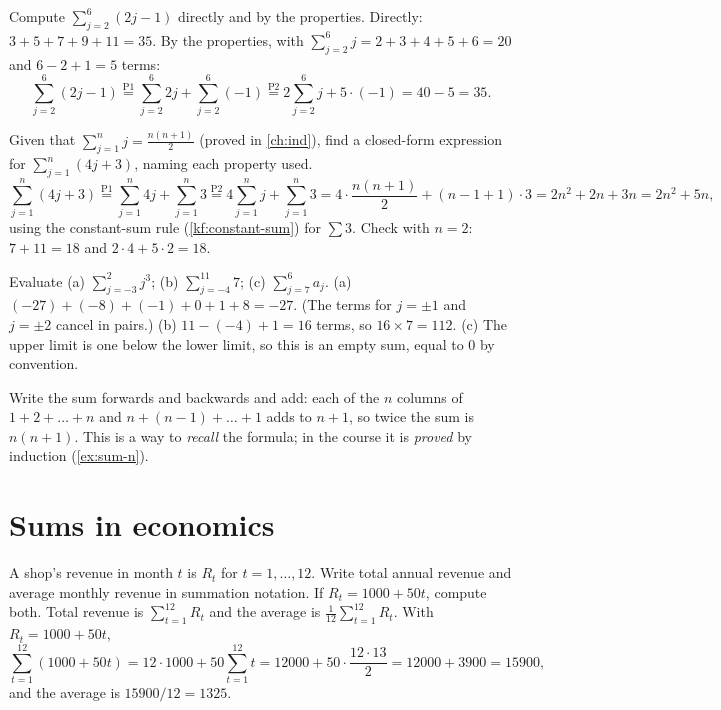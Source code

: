 \begin{example}
Compute $\sum_{j=2}^{6}(2j-1)$ directly and by the properties.
\solution
Directly: $3+5+7+9+11=35$. By the properties, with $\sum_{j=2}^6 j=2+3+4+5+6=20$ and $6-2+1=5$ terms:
\[
\sum_{j=2}^{6}(2j-1)\overset{\text{P1}}{=}\sum_{j=2}^{6}2j+\sum_{j=2}^{6}(-1)\overset{\text{P2}}{=}2\sum_{j=2}^{6}j+5\cdot(-1)=40-5=35.
\]
\end{example}

\begin{example}
Given that $\sum_{j=1}^{n}j=\frac{n(n+1)}{2}$ (proved in \cref{ch:ind}), find a closed-form expression for
$\sum_{j=1}^{n}(4j+3)$, naming each property used. 
\solution
\[
\sum_{j=1}^{n}(4j+3)\overset{\text{P1}}{=}\sum_{j=1}^{n}4j+\sum_{j=1}^{n}3\overset{\text{P2}}{=}4\sum_{j=1}^{n}j+\sum_{j=1}^{n}3
=4\cdot\frac{n(n+1)}{2}+(n-1+1)\cdot3=2n^2+2n+3n=2n^2+5n,
\]
using the constant-sum rule (\cref{kf:constant-sum}) for $\sum 3$. Check with $n=2$: $7+11=18$ and
$2\cdot4+5\cdot2=18$.
\end{example}

\begin{example}
Evaluate (a) $\sum_{j=-3}^{2}j^3$; (b) $\sum_{j=-4}^{11}7$; (c) $\sum_{j=7}^{6}a_j$.
\solution
(a) $(-27)+(-8)+(-1)+0+1+8=-27$. (The terms for $j=\pm1$ and $j=\pm2$ cancel in pairs.)
(b) $11-(-4)+1=16$ terms, so $16\times7=112$.
(c) The upper limit is one below the lower limit, so this is an empty sum, equal to $0$ by convention.
\end{example}

\begin{external}[Recalling $\sum_{j=1}^n j$ by pairing]
Write the sum forwards and backwards and add: each of the $n$ columns of $1+2+\dots+n$ and $n+(n-1)+\dots+1$ adds to
$n+1$, so twice the sum is $n(n+1)$. This is a way to \emph{recall} the formula; in the course it is \emph{proved} by
induction (\cref{ex:sum-n}).
\end{external}

\section{Sums in economics}\label{sec:sigma-econ}

\begin{example}
A shop's revenue in month $t$ is $R_t$ for $t=1,\dots,12$. Write total annual revenue and average monthly revenue in
summation notation. If $R_t=1000+50t$, compute both.
\solution
Total revenue is $\sum_{t=1}^{12}R_t$ and the average is $\frac1{12}\sum_{t=1}^{12}R_t$. With $R_t=1000+50t$,
\[
\sum_{t=1}^{12}(1000+50t)=12\cdot1000+50\sum_{t=1}^{12}t=12000+50\cdot\frac{12\cdot13}{2}=12000+3900=15900,
\]
and the average is $15900/12=1325$.
\end{example}

